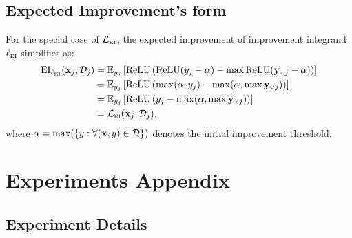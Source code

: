 \subsection{Expected Improvement's \mmform{} form}

For the special case of \(\mathcal{L}_{\scriptscriptstyle{\ensuremath{\operatorname{EI}}}}\), the expected improvement of improvement integrand \(\ell_{\scriptscriptstyle{\ensuremath{\operatorname{EI}}}}\) simplifies as:
\begin{align}
\begin{split}
\EI_{\acq_{\acqSubscript{\EI}}}(\NEW{1}{\x}, \data_{\roundIdx})
    &= 
        \E_{\NEW{1}{\y}}\left[
        \relu\left(
          \relu(\NEW{1}{\y} - \level) - \max \relu(\OLD{1}{\Y} - \level)
        \right)\right]\\
    &= 
        \E_{\NEW{1}{\y}}\left[
        \relu\left(
          \max(\level, \NEW{1}{\y}) - \max(\level, \max \OLD{1}{\Y})
        \right)\right]\\
    &= 
        \E_{\NEW{1}{\y}}\left[
        \relu\left(
          \NEW{1}{\y} - \max(\level, \max \OLD{1}{\Y})
        \right)\right]\\
    &= 
        \Acq_{\acqSubscript{\EI}}(\NEW{1}{\x}; \data_{\roundIdx}),
\end{split}
\label{eq:\mmform{}_ei}
\end{align}
where \(\alpha = \max(\{y : \forall (\mathbf{x}, y) \in \mathcal{D}\})\) denotes the initial improvement threshold.

\section{Experiments Appendix}
\label{appendix:experiments}

\subsection{Experiment Details}
\label{appendix:experiment_details}

